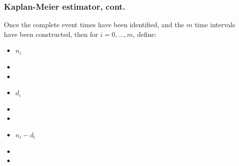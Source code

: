\begin{frame}
\frametitle{Kaplan-Meier estimator, cont.}
Once the complete event times have been identified, and the $m$ time intervals have been constructed, then for
$i=0,\dots,m$, define:
\begin{itemize}

\item $n_i$
\item[]
\item[]

\item $d_i$
\item[]
\item[]

\item $n_i-d_i$
\item[]
\item[]




\end{itemize}
\end{frame}

